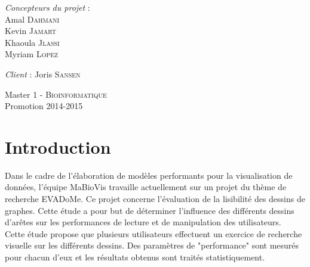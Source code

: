 \documentclass[a4paper]{report}
\begin{document}
\begin{center}
\begin{minipage}{0.4\textwidth}
\begin{flushleft} \large
\emph{Concepteurs du projet} :\\
\vspace{1\baselineskip}
        Amal \textsc{Dahmani}\\
        Kevin \textsc{Jamart}\\
        Khaoula \textsc{Jlassi}\\
        Myriam \textsc{Lopez}\\
\end{flushleft}
\end{minipage}
\begin{minipage}{0.4\textwidth}
\begin{flushright} \large
\emph{Client} : Joris \textsc{Sansen}\\
\end{flushright}
\end{minipage}

\begin{center}

\large
Master 1 - \textsc{Bioinformatique} \\
Promotion 2014-2015

\end{center}

\end{center}

\newpage


\tableofcontents

\newpage
{}


\section*{Introduction}

Dans le cadre de l'élaboration de modèles performants pour la visualisation de données, l'équipe MaBioVis\cite{ref1} travaille actuellement sur un projet du thème de recherche EVADoMe\cite{ref2}. Ce projet concerne l'évaluation de la lisibilité des dessins de graphes. Cette étude a pour but de déterminer l'influence des différents dessins d'arêtes sur les performances de lecture et de manipulation des utilisateurs.\\

Cette étude propose que plusieurs utilisateurs effectuent un exercice de recherche visuelle sur les différents dessins. Des paramètres de "performance" sont mesurés pour chacun d'eux et les résultats obtenus sont traités statistiquement.\\
\end{document}
